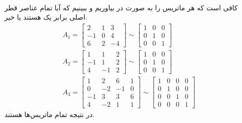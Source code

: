 \\
کافی است که هر ماتریس را به صورت
در بیاوریم و ببینیم که آیا تمام عناصر قطر اصلی برابر یک هستند یا خیر.
\begin{gather*}
    A_1 = \begin{bmatrix}
        2 & 1 & 3\\
        -1 & 0 & 4\\
        6 & 2 & -4
    \end{bmatrix}
    \sim
    \begin{bmatrix}
        1 & 0 & 0\\
        0 & 1 & 0\\
        0 & 0 & 1
    \end{bmatrix}
    \\
    A_2 = \begin{bmatrix}
        1 & 1 & 2\\
        -1 & 1 & 2\\
        4 & -1 & 2
    \end{bmatrix}
    \sim
    \begin{bmatrix}
        1 & 0 & 0\\
        0 & 1 & 0\\
        0 & 0 & 1
    \end{bmatrix}
    \\
    A_3 = \begin{bmatrix}
        1 & 2 & 6 & 1\\
        0 & -2 & -1 & 0\\
        -1 & 3 & 3 & 6\\
        4 & -2 & 1 & 1
    \end{bmatrix}
    \sim
    \begin{bmatrix}
        1 & 0 & 0 & 0\\
        0 & 1 & 0 & 0\\
        0 & 0 & 1 & 0\\
        0 & 0 & 0 & 1
    \end{bmatrix}
\end{gather*}
در نتیجه تمام ماتریس‌ها
هستند.
\\
